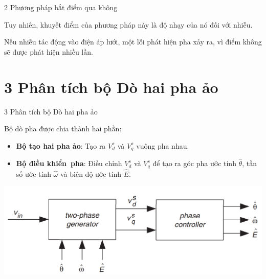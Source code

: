 \documentclass[11pt]{beamer}
\renewcommand{\label}[1]{%
			\gdef\sfname{sf:##1}}%
\begin{document}
	\begin{frame}[t]{2 Phương pháp bắt điểm qua không}
		
		Tuy nhiên, khuyết điểm của phương pháp này là độ nhạy của nó đối với nhiễu.
		\vspace{0.1cm}
		
		Nếu nhiễu tác động vào điện áp lưới, một lỗi phát hiện pha xảy ra, vì điểm không sẽ được phát hiện nhiều lần.
		
	\end{frame}


\section{3 Phân tích bộ Dò hai pha ảo}
	\begin{frame}[t]{3 Phân tích bộ Dò hai pha ảo}
		
		Bộ dò pha được chia thành hai phần:
		\begin{itemize}
			\item \textbf{Bộ tạo hai pha ảo}: Tạo ra $V_d^s$ và $V_q^s$ vuông pha nhau.
			\item \textbf{Bộ điều khiển pha}: Điều chỉnh $V_d^s$ và $V_q^s$ để tạo ra góc pha ước tính $\hat\theta$, tần số ước tính $\hat{\omega}$ và biên độ ước tính $\hat{E}$.
		\end{itemize}
	
		\begin{sourcefigure}[h]
			
			\includegraphics[width=1\textwidth]{Fig. 3 Virtual two-phase detector.PNG}
			\caption{\textit{Bộ Dò 2 pha ảo}}
			\label{fig:Bộ Dò 2 pha ảo}
		\end{sourcefigure}
		
		
	\end{frame}
\end{document}
